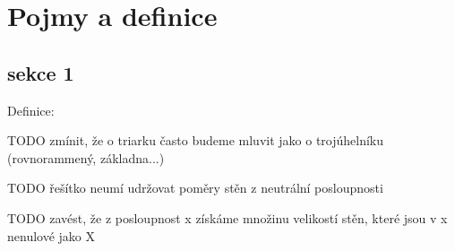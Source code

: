
\chapter{Pojmy a definice}

\section{sekce 1}
Definice: 

TODO zmínit, že o triarku často budeme mluvit jako o trojúhelníku (rovnorammený, základna...)

TODO řešítko neumí udržovat poměry stěn z neutrální posloupnosti

TODO zavést, že z posloupnost x získáme množinu velikostí stěn, které jsou v x nenulové jako X